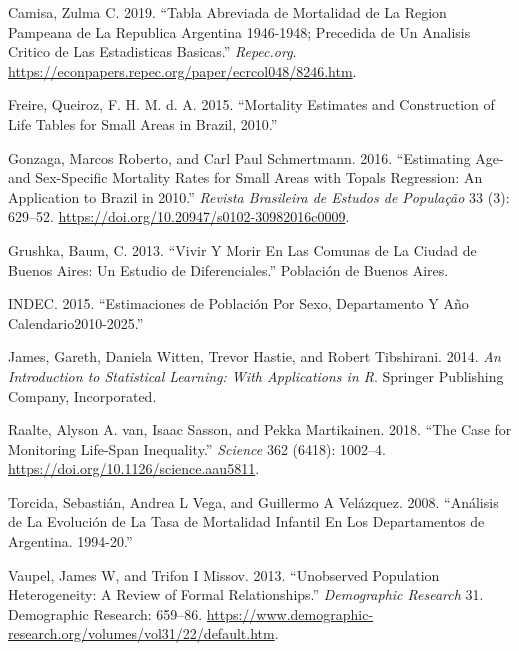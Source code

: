 \documentclass[12pt,]{article}
\begin{document}
\hypertarget{refs}{}
\leavevmode\hypertarget{ref-Camisa_2019}{}%
Camisa, Zulma C. 2019. ``Tabla Abreviada de Mortalidad de La Region
Pampeana de La Republica Argentina 1946-1948; Precedida de Un Analisis
Critico de Las Estadisticas Basicas.'' \emph{Repec.org}.
\url{https://econpapers.repec.org/paper/ecrcol048/8246.htm}.

\leavevmode\hypertarget{ref-FreireEtAl2015}{}%
Freire, Queiroz, F. H. M. d. A. 2015. ``Mortality Estimates and
Construction of Life Tables for Small Areas in Brazil, 2010.''

\leavevmode\hypertarget{ref-Gonzaga_Schmertmann_2016}{}%
Gonzaga, Marcos Roberto, and Carl Paul Schmertmann. 2016. ``Estimating
Age- and Sex-Specific Mortality Rates for Small Areas with Topals
Regression: An Application to Brazil in 2010.'' \emph{Revista Brasileira
de Estudos de População} 33 (3): 629--52.
\url{https://doi.org/10.20947/s0102-30982016c0009}.

\leavevmode\hypertarget{ref-Grushka2013}{}%
Grushka, Baum, C. 2013. ``Vivir Y Morir En Las Comunas de La Ciudad de
Buenos Aires: Un Estudio de Diferenciales.'' Población de Buenos Aires.

\leavevmode\hypertarget{ref-INDEC2015}{}%
INDEC. 2015. ``Estimaciones de Población Por Sexo, Departamento Y Año
Calendario2010-2025.''

\leavevmode\hypertarget{ref-James2014}{}%
James, Gareth, Daniela Witten, Trevor Hastie, and Robert Tibshirani.
2014. \emph{An Introduction to Statistical Learning: With Applications
in R}. Springer Publishing Company, Incorporated.

\leavevmode\hypertarget{ref-vanRaalte_Sasson_Martikainen_2018}{}%
Raalte, Alyson A. van, Isaac Sasson, and Pekka Martikainen. 2018. ``The
Case for Monitoring Life-Span Inequality.'' \emph{Science} 362 (6418):
1002--4. \url{https://doi.org/10.1126/science.aau5811}.

\leavevmode\hypertarget{ref-torcida2008}{}%
Torcida, Sebastián, Andrea L Vega, and Guillermo A Velázquez. 2008.
``Análisis de La Evolución de La Tasa de Mortalidad Infantil En Los
Departamentos de Argentina. 1994-20.''

\leavevmode\hypertarget{ref-Vaupel_Missov_2013}{}%
Vaupel, James W, and Trifon I Missov. 2013. ``Unobserved Population
Heterogeneity: A Review of Formal Relationships.'' \emph{Demographic
Research} 31. Demographic Research: 659--86.
\url{https://www.demographic-research.org/volumes/vol31/22/default.htm}.
\end{document}
